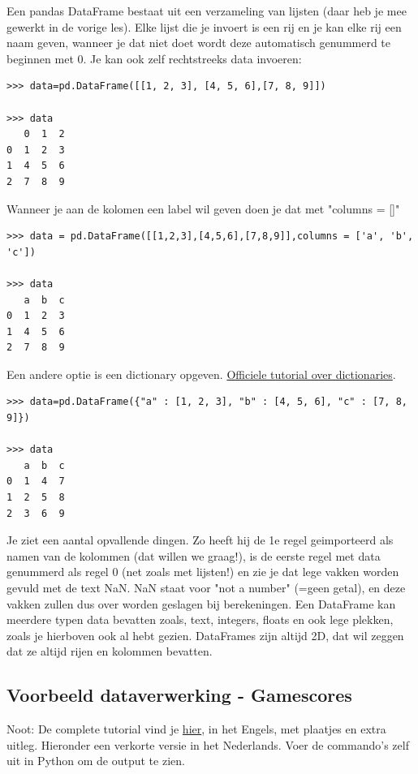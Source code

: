Een pandas DataFrame bestaat uit een verzameling van lijsten (daar heb je mee gewerkt in de vorige les). Elke lijst die je invoert is een rij en je kan elke rij een naam geven, wanneer je dat niet doet wordt deze automatisch genummerd te beginnen met 0.
Je kan ook zelf rechtstreeks data invoeren:

\begin{lstlisting}[frame=single]
>>> data=pd.DataFrame([[1, 2, 3], [4, 5, 6],[7, 8, 9]])

>>> data
   0  1  2
0  1  2  3
1  4  5  6
2  7  8  9

\end{lstlisting}
Wanneer je aan de kolomen een label wil geven doen je dat met "columns = []"

\begin{lstlisting}[frame=single]
>>> data = pd.DataFrame([[1,2,3],[4,5,6],[7,8,9]],columns = ['a', 'b', 'c'])

>>> data
   a  b  c
0  1  2  3
1  4  5  6
2  7  8  9

\end{lstlisting}
Een andere optie is een dictionary opgeven. \href{https://docs.python.org/2/tutorial/datastructures.html#dictionaries}{Officiele tutorial over dictionaries}.

\begin{lstlisting}[frame=single]
>>> data=pd.DataFrame({"a" : [1, 2, 3], "b" : [4, 5, 6], "c" : [7, 8, 9]})

>>> data
   a  b  c
0  1  4  7
1  2  5  8
2  3  6  9

\end{lstlisting}
Je ziet een aantal opvallende dingen. Zo heeft hij de 1e regel geimporteerd als namen van de kolommen (dat willen we graag!), is de eerste regel met data genummerd als regel 0 (net zoals met lijsten!) en zie je dat lege vakken worden gevuld met de text NaN. NaN staat voor "not a number" (=geen getal), en deze vakken zullen dus over worden geslagen bij berekeningen.
Een DataFrame kan meerdere typen data bevatten zoals, text, integers, floats en ook lege plekken, zoals je hierboven ook al hebt gezien. DataFrames zijn altijd 2D, dat wil zeggen dat ze altijd rijen en kolommen bevatten.

\subsection{Voorbeeld dataverwerking - Gamescores}
Noot: De complete tutorial vind je \href{https://www.dataquest.io/blog/pandas-python-tutorial/}{hier}, in het Engels, met plaatjes en extra uitleg. Hieronder een verkorte versie in het Nederlands. Voer de commando's zelf uit in Python om de output te zien. 


